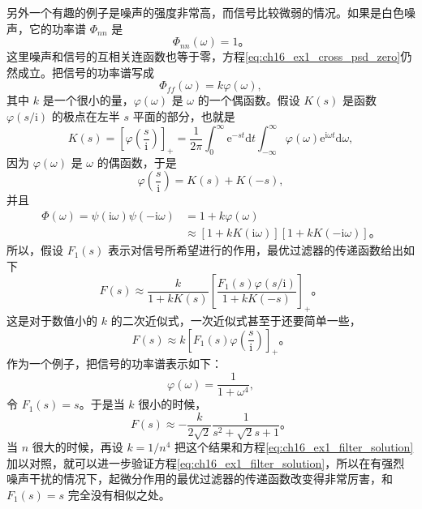 另外一个有趣的例子是噪声的强度非常高，而信号比较微弱的情况。如果是白色噪声，它的功率谱 $\Phi_{nn}$ 是
\begin{equation}
\Phi_{nn}(\omega)=1。
\label{eq:ch16_ex2_noise_psd}
\end{equation}
这里噪声和信号的互相关连函数也等于零，方程\eqref{eq:ch16_ex1_cross_psd_zero}仍然成立。把信号的功率谱写成
\begin{equation}
\Phi_{ff}(\omega)=k\varphi(\omega),
\label{eq:ch16_ex2_scaled_signal_psd}
\end{equation}
其中 $k$ 是一个很小的量，$\varphi(\omega)$ 是 $\omega$ 的一个偶函数。假设 $K(s)$ 是函数 $\varphi(s/\mathrm{i})$ 的极点在左半 $s$ 平面的部分，也就是
\begin{equation}
K(s)=\left[\varphi\left(\frac{s}{\mathrm{i}}\right)\right]_+=\frac{1}{2\pi}\int_{0}^{\infty}\mathrm{e}^{-st}\mathrm{d}t\int_{-\infty}^{\infty}\varphi(\omega)\mathrm{e}^{\mathrm{i}\omega t}\mathrm{d}\omega,
\label{eq:ch16_ex2_k_function_def}
\end{equation}
因为 $\varphi(\omega)$ 是 $\omega$ 的偶函数，于是
\begin{equation}
\varphi\left(\frac{s}{\mathrm{i}}\right)=K(s)+K(-s),
\label{eq:ch16_ex2_phi_split}
\end{equation}
并且
\begin{equation}
\begin{aligned}
\Phi(\omega)=\psi(\mathrm{i}\omega)\psi(-\mathrm{i}\omega)&=1+k\varphi(\omega) \\
&\approx\left[1+kK(\mathrm{i}\omega)\right]\left[1+kK(-\mathrm{i}\omega)\right]。
\end{aligned}
\label{eq:ch16_ex2_phi_approx}
\end{equation}
所以，假设 $F_1(s)$ 表示对信号所希望进行的作用，最优过滤器的传递函数给出如下
\begin{equation}
F(s)\approx\frac{k}{1+kK(s)}\left[\frac{F_1(s)\varphi(s/\mathrm{i})}{1+kK(-s)}\right]_+。
\label{eq:ch16_ex2_filter_approx}
\end{equation}
这是对于数值小的 $k$ 的二次近似式，一次近似式甚至于还要简单一些，
\begin{equation}
F(s)\approx k\left[F_1(s)\varphi\left(\frac{s}{\mathrm{i}}\right)\right]_+。
\label{eq:ch16_ex2_filter_linear_approx}
\end{equation}
作为一个例子，把信号的功率谱表示如下：
\begin{equation*}
\varphi(\omega)=\frac{1}{1+\omega^4},
\end{equation*}
令 $F_1(s)=s$。于是当 $k$ 很小的时候，
\begin{equation*}
F(s)\approx-\frac{k}{2\sqrt{2}}\frac{1}{s^2+\sqrt{2}s+1}。
\end{equation*}
当 $n$ 很大的时候，再设 $k=1/n^4$ 把这个结果和方程\eqref{eq:ch16_ex1_filter_solution}加以对照，就可以进一步验证方程\eqref{eq:ch16_ex1_filter_solution}，所以在有强烈噪声干扰的情况下，起微分作用的最优过滤器的传递函数改变得非常厉害，和 $F_1(s)=s$ 完全没有相似之处。


